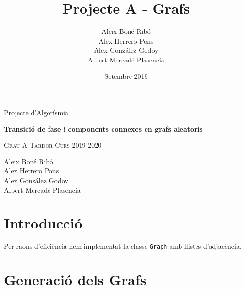 


%

\title{Projecte A - Grafs}
\author{
Aleix Boné Ribó\\
Alex Herrero Pons\\
Alex González Godoy\\
Albert Mercadé Plasencia\\
}
\date{Setembre 2019}



\thispagestyle{empty}
\clearpage
\setcounter{page}{-1}

\begin{titlepage}
{
    \centering
    \null
    \vfill
    {\Large Projecte d'Algorísmia\par}
    \vspace{2em}
    {\Huge \bfseries 
    Transició de fase i components connexes en grafs aleatoris
    \par}
    \vspace{2em}
    {\large \scshape 
    Grau A \qquad Tardor Curs 2019-2020
    \par}
    \vfill
\begin{center}
    
\end{center}
    \vspace{3cm}

    \vfill
    {\raggedleft \large
Aleix Boné Ribó\\
Alex Herrero Pons\\
Alex González Godoy\\
Albert Mercadé Plasencia\\
        \par}
}
\end{titlepage}

\pagebreak
{} 

\tableofcontents
\pagebreak
{} 

\section{Introducció}
Per raons d'eficiència hem implementat la classe \texttt{Graph} amb llistes d'adjacència. 

\section{Generació dels Grafs}
